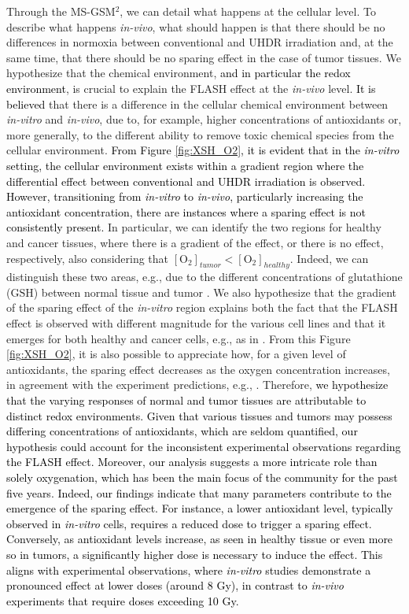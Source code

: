 \documentclass[10pt]{iopart}
\newcommand{\fra}[1]{\textcolor{black}{#1}}
\numberwithin{table}{section}
\begin{document}
Through the MS-GSM$^2$, we can detail what happens at the cellular level. To describe what happens \textit{in-vivo}, what should happen is that there should be no differences in normoxia between conventional and UHDR irradiation and, at the same time, that there should be no sparing effect in the case of tumor tissues. We hypothesize that the chemical environment, \fra{and in particular the redox environment}, is crucial to explain the FLASH effect at the \textit{in-vivo} level. \fra{It is believed} that there is a difference in the cellular chemical environment between \textit{in-vitro} and \textit{in-vivo}, due to, for example, higher concentrations of antioxidants or, more generally, to the different ability to remove toxic chemical species from the cellular environment. \fra{From Figure \ref{fig:XSH_O2}, it is evident that in the \textit{in-vitro} setting, the cellular environment exists within a gradient region where the differential effect between conventional and UHDR irradiation is observed. However, transitioning from \textit{in-vitro} to \textit{in-vivo}, particularly increasing the antioxidant concentration, there are instances where a sparing effect is not consistently present.} In particular, we can identify the two regions for healthy and cancer tissues, where there is a gradient of the effect, or there is no effect, respectively, also considering that $[\mathrm{O_2}]_{tumor} < [\mathrm{O_2}]_{healthy}$. Indeed, we can distinguish these two areas, e.g., due to the different concentrations of glutathione ($\mathrm{GSH}$) between normal tissue and tumor \cite{Gamcsik2012}. We also hypothesize that the gradient of the sparing effect of the \textit{in-vitro} region explains both the fact that the FLASH effect is observed with different magnitude for the various cell lines and that it emerges for both healthy and cancer cells, e.g., as in \cite{Adrian2021}. From this Figure \ref{fig:XSH_O2}, it is also possible to appreciate how, for a given level of antioxidants, the sparing effect decreases as the oxygen concentration increases, in agreement with the experiment predictions, e.g., \cite{Tinganelliinvitro2022}. Therefore, \fra{we hypothesize that the varying responses of normal and tumor tissues are attributable to distinct redox environments. Given that various tissues and tumors may possess differing concentrations of antioxidants, which are seldom quantified, our hypothesis could account for the inconsistent experimental observations regarding the FLASH effect. Moreover, our analysis suggests a more intricate role than solely oxygenation, which has been the main focus of the community for the past five years. Indeed, our findings indicate that many parameters contribute to the emergence of the sparing effect. For instance, a lower antioxidant level, typically observed in \textit{in-vitro} cells, requires a reduced dose to trigger a sparing effect. Conversely, as antioxidant levels increase, as seen in healthy tissue or even more so in tumors, a significantly higher dose is necessary to induce the effect. This aligns with experimental observations, where \textit{in-vitro} studies demonstrate a pronounced effect at lower doses (around 8 Gy), in contrast to \textit{in-vivo} experiments that require doses exceeding 10 Gy.} 
\end{document}
